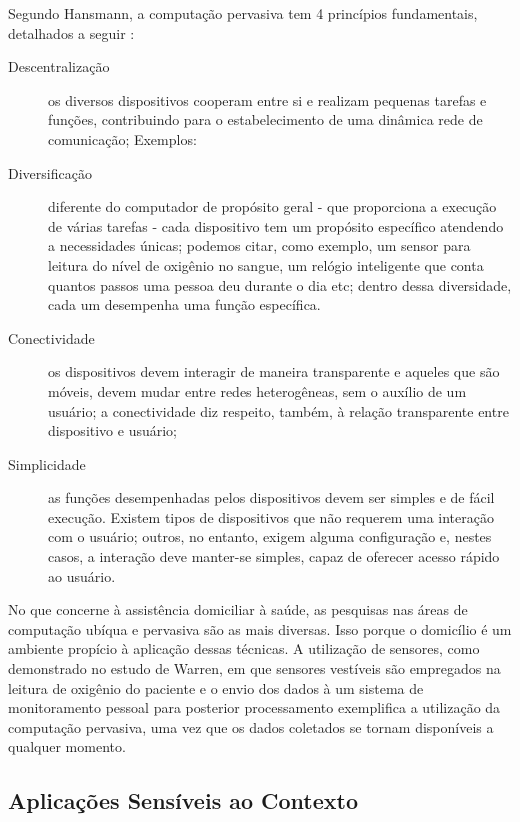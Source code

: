 

Segundo Hansmann, a computação pervasiva tem 4 princípios fundamentais,
detalhados a seguir \cite{hansmann2013pervasive}:

\begin{description}
  \item [Descentralização] os diversos dispositivos cooperam entre si e realizam
  pequenas tarefas e funções, contribuindo para o estabelecimento de uma 
  dinâmica rede de comunicação; Exemplos: 
  \item [Diversificação] diferente do computador de propósito geral - que 
  proporciona a execução de várias tarefas - cada dispositivo tem um propósito
  específico atendendo a necessidades únicas; podemos citar, como exemplo, um
  sensor para leitura do nível de oxigênio no sangue, um relógio inteligente
  que conta quantos passos uma pessoa deu durante o dia etc; dentro dessa 
  diversidade, cada um desempenha uma função específica.
  \item [Conectividade] os dispositivos devem interagir de maneira transparente
  e aqueles que são móveis, devem mudar entre redes heterogêneas, sem o 
  auxílio de um usuário; a conectividade diz respeito, também, à relação 
  transparente entre dispositivo e usuário; 
  \item [Simplicidade] as funções desempenhadas pelos dispositivos devem ser
  simples e de fácil execução. Existem tipos de dispositivos que não requerem 
  uma interação com o usuário; outros, no entanto, exigem alguma configuração e,
  nestes casos, a interação deve manter-se simples, capaz de oferecer acesso
  rápido ao usuário. 
\end{description}

No que concerne à assistência domiciliar à saúde, as pesquisas nas áreas de
computação ubíqua e pervasiva são as mais diversas. Isso porque o domicílio é um
ambiente propício à aplicação dessas técnicas. A utilização de sensores, como
demonstrado no estudo de Warren, em que sensores  vestíveis são empregados na
leitura de oxigênio do paciente e o envio dos dados à um sistema de
monitoramento pessoal para posterior processamento \cite{warren2002sensors}
exemplifica a utilização da computação pervasiva, uma  vez que os dados
coletados se tornam disponíveis a qualquer momento.

\subsection{Aplicações Sensíveis ao Contexto}\label{subsec:contexto}

